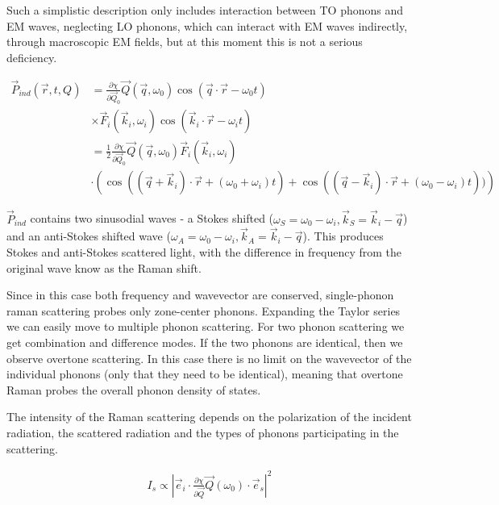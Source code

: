         Such a simplistic description only includes interaction between TO phonons and EM waves, neglecting LO phonons, which
        can interact with EM waves indirectly, through macroscopic EM fields, but at this moment this is not a serious deficiency.

        \begin{align}
            \vec{P}_{ind}(\vec{r}, t, Q) &= \frac{\partial\chi}{\partial\vec{Q}_0}\vec{Q}(\vec{q},\omega_0)\cos(\vec{q}\cdot\vec{r}-\omega_0 t) \nonumber\\
                                                    &\times\vec{F}_i(\vec{k}_i, \omega_i)\cos(\vec{k}_i\cdot\vec{r}-\omega_i t) \\
                        &= \frac{1}{2}\frac{\partial\chi}{\partial\vec{Q}_0}\vec{Q}(\vec{q},\omega_0)\vec{F}_i(\vec{k}_i, \omega_i) \nonumber\\
                        &\cdot \left( \cos((\vec{q} + \vec{k}_i)\cdot\vec{r} + (\omega_0 + \omega_i) t)
                                    + \cos((\vec{q} - \vec{k}_i)\cdot\vec{r} + (\omega_0 - \omega_i) t)) \right)
        \end{align}

        $\vec{P}_{ind}$ contains two sinusodial waves - a Stokes shifted ($\omega_S = \omega_0 - \omega_i, \vec{k}_S = \vec{k}_i - \vec{q}$) and an
        anti-Stokes shifted wave ($\omega_A = \omega_0 - \omega_i, \vec{k}_A = \vec{k}_i - \vec{q}$). This produces Stokes and anti-Stokes scattered
        light, with the difference in frequency from the original wave know as the Raman shift.

        Since in this case both frequency and wavevector are conserved, single-phonon raman scattering probes only zone-center phonons.
        Expanding the Taylor series we can easily move to multiple phonon scattering. For two phonon scattering we get combination
        and difference modes. If the two phonons are identical, then we observe overtone scattering. In this case there is no limit
        on the wavevector of the individual phonons (only that they need to be identical), meaning that overtone Raman probes the
        overall phonon density of states.

        The intensity of the Raman scattering depends on the polarization of the incident radiation, the scattered radiation and the
        types of phonons participating in the scattering.

        \begin{align}
            I_s \propto | \vec{e}_i \cdot \frac{\partial\chi}{\partial\vec{Q}}\vec{Q}(\omega_0)\cdot\vec{e}_s|^2
        \end{align}

